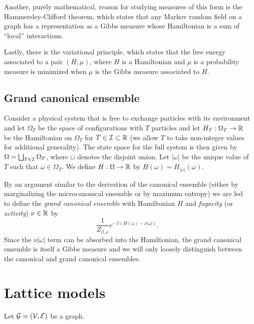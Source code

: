 Another, purely mathematical, reason for studying measures of this form is the Hammersley-Clifford
theorem, which states that any Markov random field on a graph has a representation as a Gibbs
measure whose Hamiltonian is a sum of ``local'' interactions.

Lastly, there is the variational principle, which states that the free energy associated to
a pair $(H, \mu)$, where $H$ is a Hamiltonian and $\mu$ is a probability measure is minimized
when $\mu$ is the Gibbs measure associated to $H$.


\subsection{Grand canonical ensemble}

Consider a physical system that is free to exchange particles with its environment
and let $\Omega_T$ be the space of configurations with $T$
particles and let $H_T : \Omega_T \rightarrow {\mathbb R}$ be the Hamiltonian on $\Omega_T$
for $T\in\mathcal{I}\subset{\mathbb R}$ (we allow $T$ to take non-integer values for
additional generality).
The state space for the full system is then given by $\Omega = \bigsqcup_{T \in \mathcal{I}} \Omega_T$,
where $\sqcup$ denotes the disjoint union. Let $|\omega|$ be the unique value of $T$
such that $\omega \in \Omega_T$.
We define $H : \Omega \rightarrow {\mathbb R}$ by $H(\omega) = H_{|\omega|}(\omega)$.

By an argument similar to the derivation of the canonical ensemble (either by marginalizing
the microcanonical ensemble or by maximum entropy) we are led to define the \emph{grand
canonical ensemble} with Hamiltonian $H$ and \emph{fugacity} (or \emph{activity}) $\nu \in {\mathbb R}$ by
\begin{equation}
\frac{1}{Z_{\beta,\nu}} e^{-\beta (H(\omega) - \nu |\omega|)}.
\end{equation}
Since the $\nu |\omega|$ term can be absorbed into the Hamiltonian,
the grand canonical ensemble is itself a Gibbs measure and we will only loosely
distinguish between the canonical and grand canonical ensembles. 


\section{Lattice models}

Let $\mathcal{G} = (\mathcal{V}, \mathcal{E})$ be a graph.

